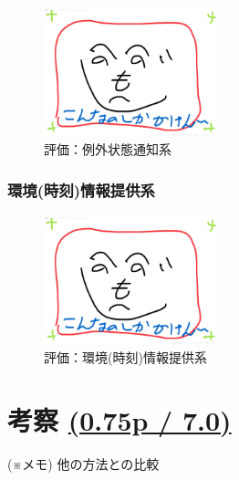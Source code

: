 {\vspace{-1zh}
\begin{figure}[H]
\centering
\includegraphics[width=5cm]{figspics/henoheno.jpeg}
\caption{評価：例外状態通知系}
\label{hohno:Eval-RaspberryComPoTE-E}
\end{figure}
\vspace{-1zh}


\subsubsection{環境(時刻)情報提供系}
\vspace{-0.5zh}

\vspace{-1zh}
\begin{figure}[H]
\centering
\includegraphics[width=5cm]{figspics/henoheno.jpeg}
\caption{評価：環境(時刻)情報提供系}
\label{hohno:Eval-RaspberryComPoTE-T}
\end{figure}
\vspace{-1zh}

\section{考察 \small{\underline{(0.75p / 7.0)}}}
\vspace{-0.5zh}
\label{sec:06discussion}

(※メモ) 他の方法との比較
\\


}
